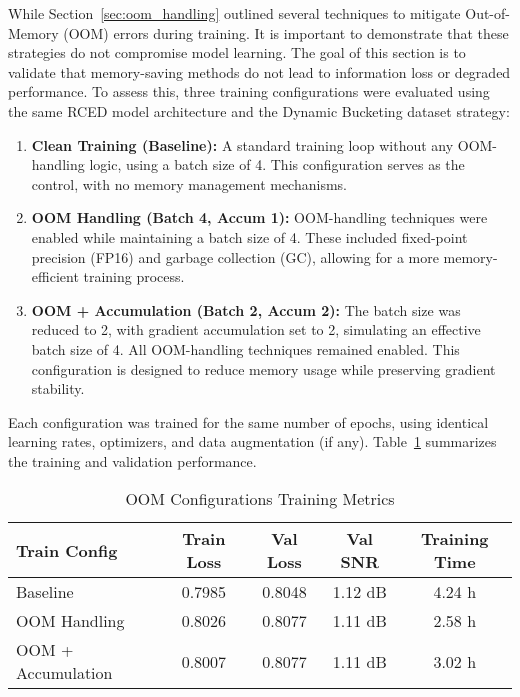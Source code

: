 While Section~\ref{sec:oom_handling} outlined several techniques to mitigate Out-of-Memory (OOM) errors during training. It is important to demonstrate that these strategies do not compromise model learning. The goal of this section is to validate that memory-saving methods do not lead to information loss or degraded performance. To assess this, three training configurations were evaluated using the same RCED model architecture and the Dynamic Bucketing dataset strategy:

\begin{enumerate}
    \item \textbf{Clean Training (Baseline):} A standard training loop without any OOM-handling logic, using a batch size of 4. This configuration serves as the control, with no memory management mechanisms.
    
    \item \textbf{OOM Handling (Batch 4, Accum 1):} OOM-handling techniques were enabled while maintaining a batch size of 4. These included fixed-point precision (FP16) and garbage collection (GC), allowing for a more memory-efficient training process.
    
    \item \textbf{OOM + Accumulation (Batch 2, Accum 2):} The batch size was reduced to 2, with gradient accumulation set to 2, simulating an effective batch size of 4. All OOM-handling techniques remained enabled. This configuration is designed to reduce memory usage while preserving gradient stability.
\end{enumerate}

Each configuration was trained for the same number of epochs, using identical learning rates, optimizers, and data augmentation (if any). Table~\ref{tab:oom_training} summarizes the training and validation performance.

\vspace{1em}
\begin{table}[H]
\centering
\caption{OOM Configurations Training Metrics}
\label{tab:oom_training}
\begin{tabular}{|l|c|c|c|c|}
\hline
\textbf{Train Config} & \textbf{Train Loss} & \textbf{Val Loss} & \textbf{Val SNR} & \textbf{Training Time} \\
\hline
Baseline               & 0.7985 & 0.8048 & 1.12 dB & 4.24 h \\
OOM Handling           & 0.8026 & 0.8077 & 1.11 dB & 2.58 h \\
OOM + Accumulation     & 0.8007 & 0.8077 & 1.11 dB & 3.02 h \\
\hline
\end{tabular}
\end{table}

